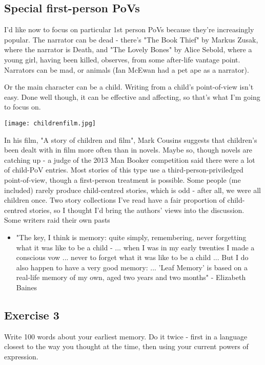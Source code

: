\documentclass[11pt]{article}
\newenvironment{narrow}[2]{%
 \begin{list}{}{%
  \setlength{\topsep}{0pt}%
  \setlength{\leftmargin}{#1}%
  \setlength{\rightmargin}{#2}%
  \setlength{\listparindent}{\parindent}%
  \setlength{\itemindent}{\parindent}%
  \setlength{\parsep}{\parskip}%
 }%
\item[]}{\end{list}}
\begin{document}
\subsection*{Special first-person PoVs}

I'd like now to focus on particular 1st person PoVs because they're increasingly popular. The narrator can be dead - there's "The Book Thief" by Markus Zusak, where the narrator is Death, and "The Lovely Bones" by Alice Sebold, where a young girl, having been killed, observes, from some after-life vantage point. Narrators can be mad, or animals (Ian McEwan had a pet ape as a narrator).




Or the main character can be a child. Writing from a child's point-of-view isn't easy. Done well though, it can be effective and affecting, so that's what I'm going to focus on.

\texttt{[image: childrenfilm.jpg]}

In his film, "A story of children and film", Mark Cousins suggests that children's been dealt with in film more often than in novels. Maybe so, though novels are catching up -  a judge of the 2013 Man Booker competition said there were a lot of child-PoV entries.
 Most stories of this type use a third-person-priviledged point-of-view, though a first-person treatment is possible. Some people (me included) rarely produce child-centred stories, which is odd - after all, we were all children once. Two story collections I've read have a fair proportion of child-centred stories, so I thought I'd bring the authors' views into the discussion.
Some writers raid their own pasts
\begin{itemize}
\item "The key, I think is memory: quite simply, remembering, never forgetting what it was like to be a child - ... when I was in my early twenties I made a conscious vow ... never to forget what it was like to be a child ... But I do also happen to have a very good memory: ... 'Leaf Memory' is based on a real-life memory of my own, aged two years and two months" - Elizabeth Baines

\end{itemize}
\subsection*{Exercise 3}
\begin{narrow}{1.0cm}{1.0cm}
Write 100 words about your earliest memory. Do it twice - first in a language closest to the way you thought at the time, then using your current powers of expression.  
\end{narrow}
\end{document}

